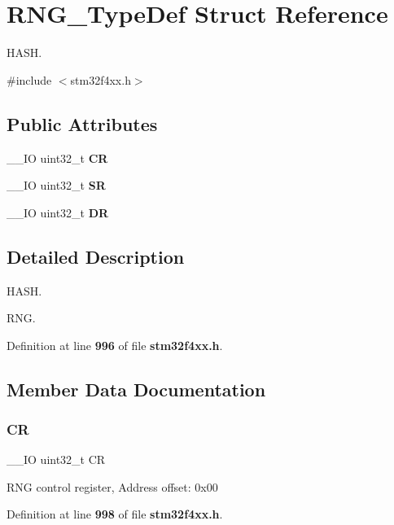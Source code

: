 \section{R\+N\+G\+\_\+\+Type\+Def Struct Reference}
\label{structRNG__TypeDef}


H\+A\+SH.  




{\ttfamily \#include $<$stm32f4xx.\+h$>$}

\subsection*{Public Attributes}
\begin{DoxyCompactItemize}
\item 
\+\_\+\+\_\+\+IO uint32\+\_\+t \textbf{ CR}
\item 
\+\_\+\+\_\+\+IO uint32\+\_\+t \textbf{ SR}
\item 
\+\_\+\+\_\+\+IO uint32\+\_\+t \textbf{ DR}
\end{DoxyCompactItemize}


\subsection{Detailed Description}
H\+A\+SH. 

R\+NG. 

Definition at line \textbf{ 996} of file \textbf{ stm32f4xx.\+h}.



\subsection{Member Data Documentation}
\mbox{\label{structRNG__TypeDef_ab40c89c59391aaa9d9a8ec011dd0907a}} 
\subsubsection{CR}
{\footnotesize\ttfamily \+\_\+\+\_\+\+IO uint32\+\_\+t CR}

R\+NG control register, Address offset\+: 0x00 

Definition at line \textbf{ 998} of file \textbf{ stm32f4xx.\+h}.

\mbox{\label{structRNG__TypeDef_a3df0d8dfcd1ec958659ffe21eb64fa94}} 
